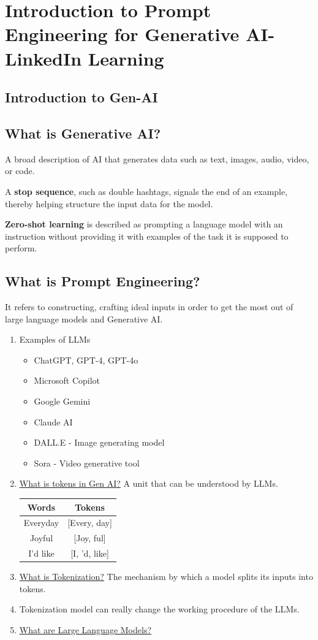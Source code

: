 \section{Introduction to Prompt Engineering for Generative AI- LinkedIn Learning}
\subsection{Introduction to Gen-AI}
\subsection*{What is Generative AI?}
\hspace{1cm} A broad description of AI that generates data such as text, images, audio, video, or code. 

A \textbf{stop sequence}, such as double hashtags, signals the end of an example, thereby helping structure the input data for the model.

\textbf{Zero-shot learning} is described as prompting a language model with an instruction without providing it with examples of the task it is supposed to perform.

\subsection*{What is Prompt Engineering?}
\hspace{1cm} It refers to constructing, crafting ideal inputs in order to get the most out of large language models and Generative AI.

\begin{enumerate}
    \item Examples of LLMs
    \begin{itemize}
        \item ChatGPT, GPT-4, GPT-4o
        \item Microsoft Copilot
        \item Google Gemini
        \item Claude AI
        \item DALL.E - Image generating model
        \item Sora - Video generative tool
    \end{itemize}
    \item \underline{What is tokens in Gen AI?} A unit that can be understood by LLMs.
    \begin{tabular}{|c|c|}
            \hline Words & Tokens   \\
            \hline Everyday & [Every, day] \\
            \hline Joyful & [Joy, ful] \\
            \hline I'd like & [I, 'd, like] \\ \hline
    \end{tabular}
    \item \underline{What is Tokenization?} The mechanism by which a model splits its inputs into tokens.
    \item Tokenization model can really change the working procedure of the LLMs.
    \item \underline{What are Large Language Models?}
\end{enumerate}

